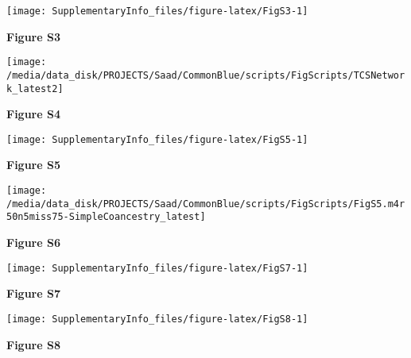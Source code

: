 \documentclass[12pt,]{article}
\begin{document}
\begin{center}\texttt{[image: SupplementaryInfo\_files/figure-latex/FigS3-1]} \end{center}

\textbf{Figure S3}

\pagebreak

\begin{center}\texttt{[image: /media/data\_disk/PROJECTS/Saad/CommonBlue/scripts/FigScripts/TCSNetwork\_latest2]} \end{center}

\textbf{Figure S4}

\begin{center}\texttt{[image: SupplementaryInfo\_files/figure-latex/FigS5-1]} \end{center}

\textbf{Figure S5}

\begin{center}\texttt{[image: /media/data\_disk/PROJECTS/Saad/CommonBlue/scripts/FigScripts/FigS5.m4r50n5miss75-SimpleCoancestry\_latest]} \end{center}

\textbf{Figure S6}

\begin{center}\texttt{[image: SupplementaryInfo\_files/figure-latex/FigS7-1]} \end{center}

\textbf{Figure S7}

\begin{center}\texttt{[image: SupplementaryInfo\_files/figure-latex/FigS8-1]} \end{center}

\textbf{Figure S8}
\end{document}
